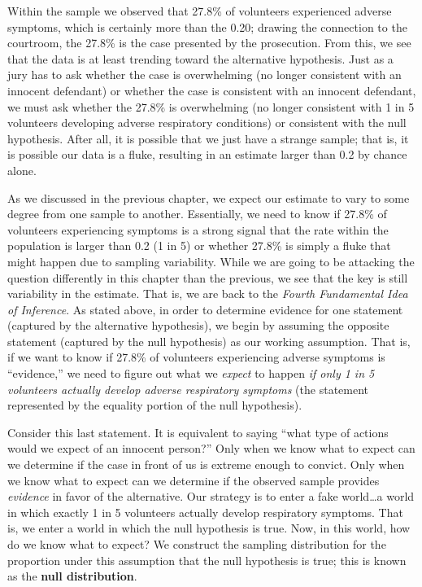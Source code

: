 \documentclass[
  letterpaper,
  DIV=11,
  numbers=noendperiod]{scrreprt}
\theoremstyle{plain}
\theoremstyle{definition}
\theoremstyle{definition}
\theoremstyle{remark}
\begin{document}
Within the sample we observed that 27.8\% of volunteers experienced
adverse symptoms, which is certainly more than the 0.20; drawing the
connection to the courtroom, the 27.8\% is the case presented by the
prosecution. From this, we see that the data is at least trending toward
the alternative hypothesis. Just as a jury has to ask whether the case
is overwhelming (no longer consistent with an innocent defendant) or
whether the case is consistent with an innocent defendant, we must ask
whether the 27.8\% is overwhelming (no longer consistent with 1 in 5
volunteers developing adverse respiratory conditions) or consistent with
the null hypothesis. After all, it is possible that we just have a
strange sample; that is, it is possible our data is a fluke, resulting
in an estimate larger than 0.2 by chance alone.

As we discussed in the previous chapter, we expect our estimate to vary
to some degree from one sample to another. Essentially, we need to know
if 27.8\% of volunteers experiencing symptoms is a strong signal that
the rate within the population is larger than 0.2 (1 in 5) or whether
27.8\% is simply a fluke that might happen due to sampling variability.
While we are going to be attacking the question differently in this
chapter than the previous, we see that the key is still variability in
the estimate. That is, we are back to the \emph{Fourth Fundamental Idea
of Inference}. As stated above, in order to determine evidence for one
statement (captured by the alternative hypothesis), we begin by assuming
the opposite statement (captured by the null hypothesis) as our working
assumption. That is, if we want to know if 27.8\% of volunteers
experiencing adverse symptoms is ``evidence,'' we need to figure out
what we \emph{expect} to happen \emph{if only 1 in 5 volunteers actually
develop adverse respiratory symptoms} (the statement represented by the
equality portion of the null hypothesis).

Consider this last statement. It is equivalent to saying ``what type of
actions would we expect of an innocent person?'' Only when we know what
to expect can we determine if the case in front of us is extreme enough
to convict. Only when we know what to expect can we determine if the
observed sample provides \emph{evidence} in favor of the alternative.
Our strategy is to enter a fake world\ldots a world in which exactly 1
in 5 volunteers actually develop respiratory symptoms. That is, we enter
a world in which the null hypothesis is true. Now, in this world, how do
we know what to expect? We construct the sampling distribution for the
proportion under this assumption that the null hypothesis is true; this
is known as the \textbf{null distribution}.
\end{document}
